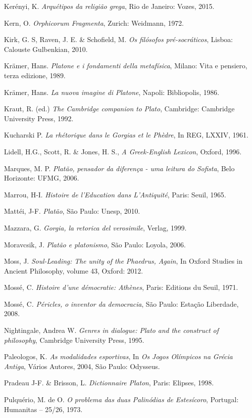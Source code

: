 Kerényi, K. \emph{Arquétipos da religião grega}, Rio de Janeiro: Vozes,
2015.

Kern, O. \emph{Orphicorum Fragmenta}, Zurich: Weidmann, 1972.

Kirk, G. S, Raven, J. E. \& Schofield, M. \emph{Os filósofos
pré-socráticos}, Lisboa: Calouste Gulbenkian, 2010.

Krämer, Hans. \emph{Platone e i fondamenti della metafísica}, Milano:
Vita e pensiero, terza edizione, 1989.

Krämer, Hans. \emph{La nuova imagine di Platone}, Napoli: Bibliopolis,
1986.

Kraut, R. (ed.) \emph{The Cambridge companion to Plato}, Cambridge:
Cambridge University Press, 1992.

Kucharski P. \emph{La rhétorique dans le Gorgias et le Phèdre}, In REG,
LXXIV, 1961.

Lidell, H.G., Scott, R. \& Jones, H. S., \emph{A Greek-English Lexicon},
Oxford, 1996.

Marques, M. P. \emph{Platão, pensador da diferença - uma leitura do
Sofista}, Belo Horizonte: UFMG, 2006.

Marrou, H-I. \emph{Histoire de l'Education dans L'Antiquité}, Paris:
Seuil, 1965.

Mattéi, J-F. \emph{Platão}, São Paulo: Unesp, 2010.

Mazzara, G. \emph{Gorgia, la retorica del verosimile}, Verlag, 1999.

Moravcsik, J. \emph{Platão e platonismo}, São Paulo: Loyola, 2006.

Moss, J. \emph{Soul-Leading: The unity of the Phaedrus, Again}, In
Oxford Studies in Ancient Philosophy, volume 43, Oxford: 2012.

Mossé, C. \emph{Histoire d'une démocratie: Athènes}, Paris: Editions du
Seuil, 1971.

Mossé, C\emph{. Péricles, o inventor da democracia}, São Paulo: Estação
Liberdade, 2008.

Nightingale, Andrea W. \emph{Genres in dialogue: Plato and the construct
of philosophy}, Cambridge University Press, 1995.

Paleologos, K\emph{. As modalidades esportivas}, In \emph{Os Jogos
Olímpicos na Grécia Antiga}, Vários Autores, 2004, São Paulo: Odysseus.

Pradeau J-F. \& Brisson, L. \emph{Dictionnaire Platon}, Paris: Elipses,
1998.

Pulquério, M. de O. \emph{O problema das duas Palinódias de Estesícoro},
Portugal: Humanitas -- 25/26, 1973.

